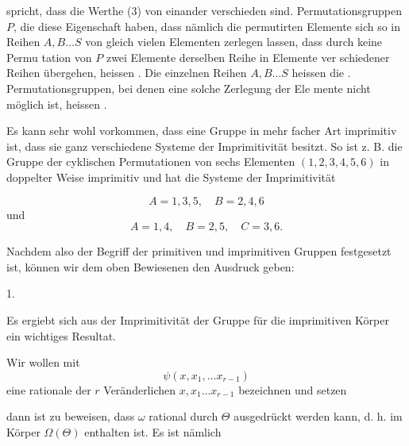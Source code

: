 spricht, dass die Werthe (3) von einander verschieden sind.
Permutationsgruppen $P$, die diese Eigenschaft haben, dass nämlich
die permutirten Elemente sich so in Reihen $A, B \dots S$ von
gleich vielen Elementen zerlegen lassen, dass durch keine Permu\-
tation von $P$ zwei Elemente derselben Reihe in Elemente ver\-
schiedener Reihen übergehen, heissen . Die einzelnen
Reihen $A, B \dots S$ heissen die .
Permutationsgruppen, bei denen eine solche Zerlegung der Ele\-
mente nicht möglich ist, heissen .

Es kann sehr wohl vorkommen, dass eine Gruppe in mehr\-
facher Art imprimitiv ist, dass sie ganz verschiedene Systeme
der Imprimitivität besitzt. So ist z. B. die Gruppe der cyklischen
Permutationen von sechs Elementen $(1, 2, 3, 4, 5, 6)$ in doppelter
Weise imprimitiv und hat die Systeme der Imprimitivität

\[
A = 1, 3, 5, \quad B = 2, 4, 6
\]
und
\[
A = 1, 4, \quad B = 2, 5, \quad C = 3, 6.
\]

Nachdem also der Begriff der primitiven und imprimitiven
Gruppen festgesetzt ist, können wir dem oben Bewiesenen den
Ausdruck geben:

1. 

Es ergiebt sich aus der Imprimitivität der Gruppe für die
imprimitiven Körper ein wichtiges Resultat.

Wir wollen mit
\[
\psi(x, x_1, \dots x_{r-1})
\]
eine rationale  der $r$ Veränderlichen
$x, x_1 \dots x_{r-1}$ bezeichnen und setzen

dann ist zu beweisen, dass $\omega$ rational durch $\Theta$ ausgedrückt
werden kann, d. h. im Körper $\Omega(\Theta)$ enthalten ist. Es ist
nämlich
